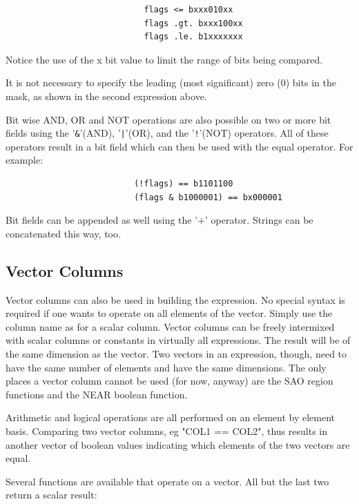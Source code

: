 \documentclass[11pt]{book}
\begin{document}
\begin{verbatim}
                            flags <= bxxx010xx
                            flags .gt. bxxx100xx
                            flags .le. b1xxxxxxx
\end{verbatim}

    Notice the use of the x bit value to limit the range of  bits  being
    compared.

    It  is  not necessary to specify the leading (most significant) zero
    (0) bits in the mask, as shown in the second expression above.

    Bit wise AND, OR and NOT operations are  also  possible  on  two  or
    more  bit  fields  using  the  '\verb+&+'(AND),  '\verb+|+'(OR),  and the '\verb+!+'(NOT)
    operators. All of these operators result in a bit  field  which  can
    then be used with the equal operator. For example:


\begin{verbatim}
                          (!flags) == b1101100
                          (flags & b1000001) == bx000001
\end{verbatim}

    Bit  fields can be appended as well using the '+' operator.  Strings
    can be concatenated this way, too.


\subsection{Vector Columns}

    Vector columns can also be used  in  building  the  expression.   No
    special  syntax  is required if one wants to operate on all elements
    of the vector.  Simply use the column name as for a  scalar  column.
    Vector  columns  can  be  freely  intermixed  with scalar columns or
    constants in virtually all expressions.  The result will be  of  the
    same dimension as the vector.  Two vectors in an expression, though,
    need to  have  the  same  number  of  elements  and  have  the  same
    dimensions.   The  only  places  a vector column cannot be used (for
    now, anyway) are the SAO  region  functions  and  the  NEAR  boolean
    function.

    Arithmetic and logical operations are all performed on an element by
    element basis.  Comparing two vector columns,  eg  "COL1  ==  COL2",
    thus  results  in  another vector of boolean values indicating which
    elements of the two vectors are equal.

    Several functions are available that operate on a vector.  All but
    the last two return a scalar result:
\end{document}
